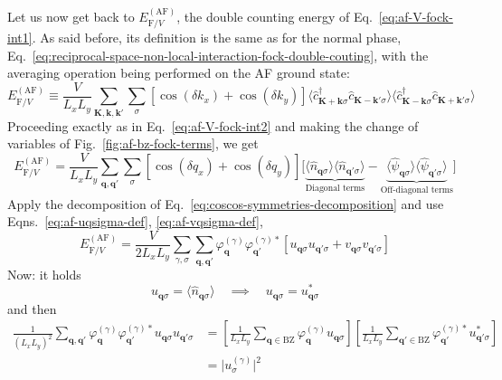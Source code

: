 Let us now get back to $E_{\mathrm{F}/V}^{(\mathrm{AF})}$, the double counting energy of Eq.~\eqref{eq:af-V-fock-int1}. As said before, its definition is the same as for the normal phase, Eq.~\eqref{eq:reciprocal-space-non-local-interaction-fock-double-couting}, with the averaging operation being performed on the AF ground state:
\begin{equation}\label{eq:af-V-fock-double-counting-int1}
	E_{\mathrm{F}/V}^{(\mathrm{AF})} \equiv \frac{V}{L_x L_y} \sum_{\mathbf{K}, \mathbf{k}, \mathbf{k}'} \sum_\sigma \left[
		\cos \left(
			\delta k_x
		\right)	+ \cos \left(
			\delta k_y
		\right)	
	\right]	
	\langle
		\hat c_{\mathbf{K}+\mathbf{k} \sigma}^\dagger 
		\hat c_{\mathbf{K}-\mathbf{k}' \sigma}
	\rangle \langle
		\hat c_{\mathbf{K}-\mathbf{k} \sigma}^\dagger  \hat c_{\mathbf{K}+\mathbf{k}'\sigma} 
	\rangle
\end{equation}
Proceeding exactly as in Eq.~\eqref{eq:af-V-fock-int2} and making the change of variables of Fig.~\ref{fig:af-bz-fock-terms}, we get
\[
	E_{\mathrm{F}/V}^{(\mathrm{AF})} = \frac{V}{L_x L_y} \sum_{\mathbf{q}, \mathbf{q}'} \sum_\sigma \left[
		\cos \left(
			\delta q_x
		\right)	+ \cos \left(
			\delta q_y
		\right)	
	\right]
	\Big[
		\underbrace{
			\langle
				\hat n_{\mathbf{q}\sigma}
			\rangle \langle
				\hat n_{\mathbf{q}'\sigma}
			\rangle
		}_\text{Diagonal terms}
		-
		\underbrace{
			\langle
				\hat \psi_{\mathbf{q}\sigma}
			\rangle \langle
				\hat \psi_{\mathbf{q}'\sigma}
			\rangle
		}_\text{Off-diagonal terms}
	\Big]
\]
Apply the decomposition of Eq.~\eqref{eq:coscos-symmetries-decomposition} and use Eqns.~\eqref{eq:af-uqsigma-def}, \eqref{eq:af-vqsigma-def},
\begin{equation}\label{eq:af-V-fock-double-counting-int2}
	E_{\mathrm{F}/V}^{(\mathrm{AF})} = \frac{V}{2 L_x L_y} \sum_{\gamma,\sigma} \sum_{\mathbf{q}, \mathbf{q}'} \varphi_{\mathbf{q}}^{(\gamma)} \varphi_{\mathbf{q}'}^{(\gamma)*} \left[
		u_{\mathbf{q}\sigma} u_{\mathbf{q}'\sigma} + v_{\mathbf{q}\sigma} v_{\mathbf{q}'\sigma}
	\right]
\end{equation}
Now: it holds
\[
	u_{\mathbf{q}\sigma} = \langle
		\hat n_{\mathbf{q}\sigma}
	\rangle
	\quad\implies\quad
	u_{\mathbf{q}\sigma} = u_{\mathbf{q}\sigma}^*
\]
and then
\[
\begin{aligned}
	\frac{1}{(L_x L_y)^2} \sum_{\mathbf{q}, \mathbf{q}'} \varphi_{\mathbf{q}}^{(\gamma)} \varphi_{\mathbf{q}'}^{(\gamma)*}
	u_{\mathbf{q}\sigma} u_{\mathbf{q}'\sigma} &=
	\left[
		\frac{1}{L_x L_y} \sum_{\mathbf{q}\in\mathrm{BZ}} \varphi_{\mathbf{q}}^{(\gamma)} u_{\mathbf{q}\sigma}
	\right] \left[
		\frac{1}{L_x L_y} \sum_{\mathbf{q}'\in\mathrm{BZ}} \varphi_{\mathbf{q}'}^{(\gamma)*} u_{\mathbf{q}'\sigma}^*
	\right] \\
	&= \big|u^{(\gamma)}_\sigma\big|^2
\end{aligned}
\]
